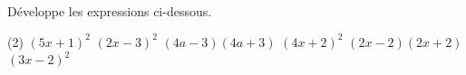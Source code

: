 %
%
    Développe les expressions ci-dessous.
    \begin{tasks}(2)
        \task $(5x+1)^2$
        \task $(2x-3)^2$
        \task $(4a-3)(4a+3)$
        \task $(4x+2)^2$
        \task $(2x-2)(2x+2)$
        \task $(3x-2)^2$
    \end{tasks}
